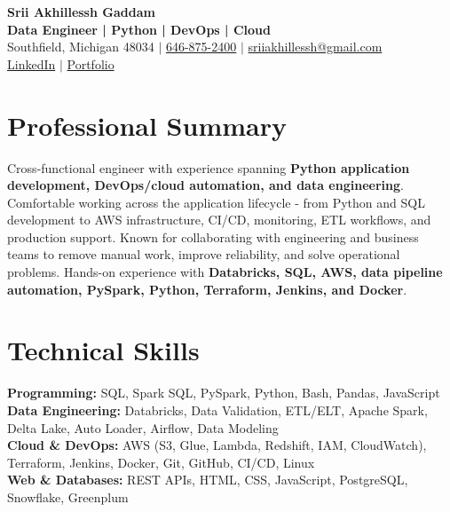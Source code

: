 \documentclass[letterpaper,10pt]{article}
\begin{document}
\fontsize{9.35pt}{10.45pt}\selectfont

\begin{center}
    {\LARGE \textbf{Srii Akhillessh Gaddam}} \\[-1pt]
    \textbf{Data Engineer | Python | DevOps | Cloud} \\[2pt]
    Southfield, Michigan 48034 $|$
    \href{tel:6468752400}{646-875-2400} $|$
    \href{mailto:sriiakhillessh@gmail.com}{sriiakhillessh@gmail.com} \\[1pt]
    \href{https://www.linkedin.com/in/srii-akhiilessh-gaddam-b48668191/}{LinkedIn} $|$
    \href{https://sriiakhillesshg.github.io/portfolio/}{Portfolio}
\end{center}
\vspace{-8pt}

\section{Professional Summary}
\small{Cross-functional engineer with experience spanning \textbf{Python application development, DevOps/cloud automation, and data engineering}. Comfortable working across the application lifecycle - from Python and SQL development to AWS infrastructure, CI/CD, monitoring, ETL workflows, and production support. Known for collaborating with engineering and business teams to remove manual work, improve reliability, and solve operational problems. Hands-on experience with \textbf{Databricks, SQL, AWS, data pipeline automation, PySpark, Python, Terraform, Jenkins, and Docker}.}

\section{Technical Skills}
\small{
\textbf{Programming:} SQL, Spark SQL, PySpark, Python, Bash, Pandas, JavaScript \\
\textbf{Data Engineering:} Databricks, Data Validation, ETL/ELT, Apache Spark, Delta Lake, Auto Loader, Airflow, Data Modeling \\
\textbf{Cloud \& DevOps:} AWS (S3, Glue, Lambda, Redshift, IAM, CloudWatch), Terraform, Jenkins, Docker, Git, GitHub, CI/CD, Linux \\
\textbf{Web \& Databases:} REST APIs, HTML, CSS, JavaScript, PostgreSQL, Snowflake, Greenplum
}

\end{document}
